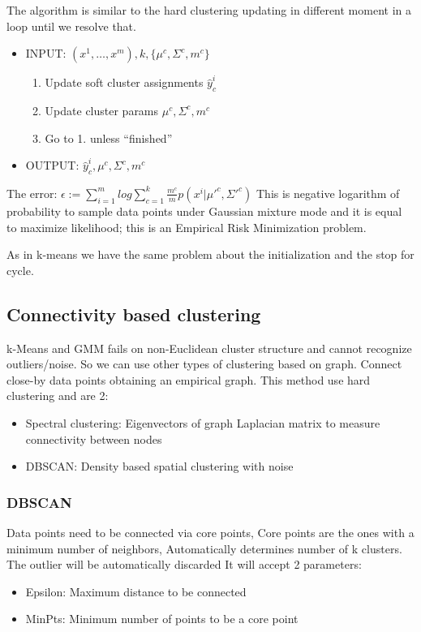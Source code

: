 The algorithm is similar to the hard clustering updating in different moment in a loop until we resolve that.

\begin{itemize}
    \item INPUT: $(x^1, \dots , x^m), k, \{ \mu^c, \Sigma^c, m^c \} $
    \begin{enumerate}
        \item  Update soft cluster assignments $\hat{y}_c^i$
        \item Update cluster params $ \mu^c, \Sigma^c, m^c $
        \item Go to 1. unless “finished”
    \end{enumerate}
    \item OUTPUT: $\hat{y}_c^i, \mu^c, \Sigma^c, m^c $
\end{itemize}

The error: $ \epsilon := \sum\limits_{i=1}^m log \sum\limits_{c=1}^k  \frac{m^c}{m} p(x^i| \mu'^c , \Sigma'^c) $ This is negative logarithm of probability to sample data points under Gaussian mixture mode and it is equal to maximize likelihood; this is an Empirical Risk Minimization problem.

As in k-means we have the same problem about the initialization and the stop for cycle.
\subsection{Connectivity based clustering}
 k-Means and GMM fails on non-Euclidean cluster structure and cannot recognize outliers/noise. So we can use other types of clustering based on graph.  Connect close-by data points obtaining an empirical graph.
 This method use hard clustering and are 2:
 \begin{itemize}
     \item Spectral clustering: Eigenvectors of graph Laplacian matrix to measure connectivity between nodes
     \item DBSCAN: Density based spatial clustering with noise
 \end{itemize}

 \subsubsection{DBSCAN}
Data points need to be connected via core points, Core points are the ones with a minimum number of neighbors, Automatically determines number of k clusters. The outlier will be automatically discarded
It will accept 2 parameters:
\begin{itemize}
    \item Epsilon: Maximum distance to be connected
    \item MinPts: Minimum number of points to be a core point
\end{itemize}

